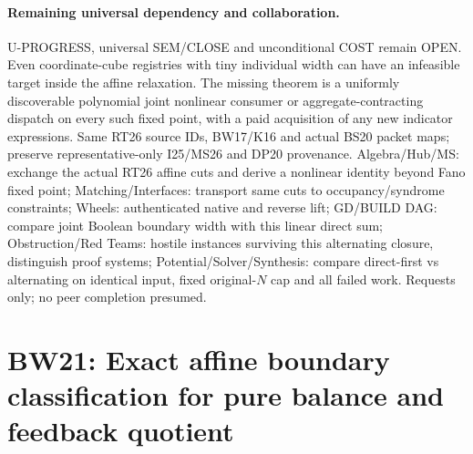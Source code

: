\documentclass[11pt]{article}
\begin{document}
\paragraph{Remaining universal dependency and collaboration.}
U-PROGRESS, universal SEM/CLOSE and unconditional COST remain OPEN. Even coordinate-cube registries with tiny individual width can have an infeasible target inside the affine relaxation. The missing theorem is a uniformly discoverable polynomial joint nonlinear consumer or aggregate-contracting dispatch on every such fixed point, with a paid acquisition of any new indicator expressions. Same RT26 source IDs, BW17/K16 and actual BS20 packet maps; preserve representative-only I25/MS26 and DP20 provenance. Algebra/Hub/MS: exchange the actual RT26 affine cuts and derive a nonlinear identity beyond Fano fixed point; Matching/Interfaces: transport same cuts to occupancy/syndrome constraints; Wheels: authenticated native and reverse lift; GD/BUILD DAG: compare joint Boolean boundary width with this linear direct sum; Obstruction/Red Teams: hostile instances surviving this alternating closure, distinguish proof systems; Potential/Solver/Synthesis: compare direct-first vs alternating on identical input, fixed original-$N$ cap and all failed work. Requests only; no peer completion presumed.


\section{BW21: Exact affine boundary classification for pure balance and feedback quotient}\label{sec:bw21}
\end{document}
